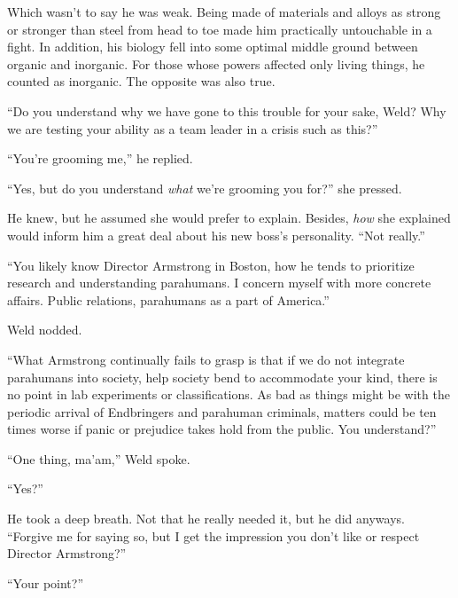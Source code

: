 Which wasn't to say he was weak.  Being made of materials and alloys as strong or stronger than steel from head to toe made him practically untouchable in a fight.  In addition, his biology fell into some optimal middle ground between organic and inorganic.  For those whose powers affected only living things, he counted as inorganic.  The opposite was also true.



``Do you understand why we have gone to this trouble for your sake, Weld?  Why we are testing your ability as a team leader in a crisis such as this?''



``You're grooming me,'' he replied.



``Yes, but do you understand \emph{what} we're grooming you for?'' she pressed.



He knew, but he assumed she would prefer to explain.  Besides, \emph{how} she explained would inform him a great deal about his new boss's personality.  ``Not really.''



``You likely know Director Armstrong in Boston, how he tends to prioritize research and understanding parahumans.  I concern myself with more concrete affairs.  Public relations, parahumans as a part of America.''



Weld nodded.



``What Armstrong continually fails to grasp is that if we do not integrate parahumans into society, help society bend to accommodate your kind, there is no point in lab experiments or classifications.  As bad as things might be with the periodic arrival of Endbringers and parahuman criminals, matters could be ten times worse if panic or prejudice takes hold from the public.  You understand?''



``One thing, ma'am,'' Weld spoke.



``Yes?''



He took a deep breath.  Not that he really needed it, but he did anyways.  ``Forgive me for saying so, but I get the impression you don't like or respect Director Armstrong?''



``Your point?''



